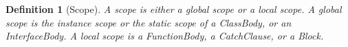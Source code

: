 \makeatletter{}\documentclass[10pt,oneside]{book}
\newcounter{base}
\newcommand{\nonterminal}[1]{{\slantsf #1}}
\theoremstyle{note}
\newtheorem{definition}{Definition}[section]
\newcommand{\slot}{{\sf slot}}
\begin{document}
\begin{definition}[Scope]\label{def:scope} A
  \emph{scope} is either a global scope or a local scope. A global
  scope is the instance
  scope or the static scope of a 
\nonterminal{ClassBody}, or an \nonterminal{InterfaceBody}. A local
scope is a 
\nonterminal{FunctionBody}, a \nonterminal{CatchClause}, or a \nonterminal{Block}.
\end{definition}

\end{document}
